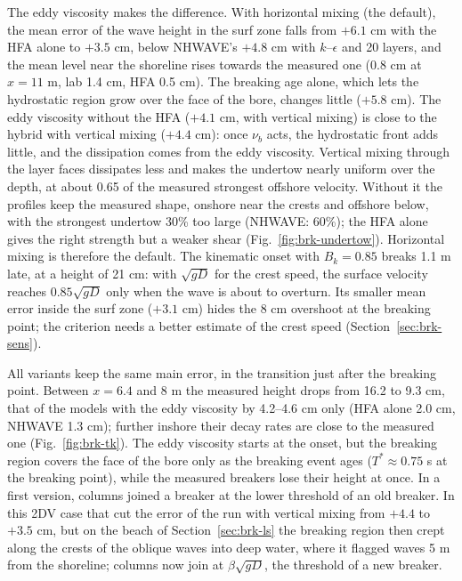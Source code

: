 The eddy viscosity makes the difference. With horizontal mixing (the
default), the mean error of the wave height in the surf zone falls from
$+6.1$ cm with the HFA alone to $+3.5$ cm, below NHWAVE's $+4.8$ cm with
$k$--$\epsilon$ and 20 layers, and the mean level near the shoreline rises
towards the measured one (0.8 cm at $x = 11$ m, lab 1.4 cm, HFA 0.5 cm).
The breaking age alone, which lets the hydrostatic region grow over the
face of the bore, changes little ($+5.8$ cm). The eddy viscosity without the HFA ($+4.1$ cm, with vertical mixing)
is close to the hybrid with vertical mixing ($+4.4$ cm): once $\nu_b$ acts,
the hydrostatic front adds little, and the dissipation comes from the eddy
viscosity. Vertical mixing through the layer faces dissipates less and
makes the undertow nearly uniform over the depth, at about 0.65 of the
measured strongest offshore velocity. Without it the profiles keep the
measured shape, onshore near the crests and offshore below, with the
strongest undertow 30\% too large (NHWAVE: 60\%); the HFA alone gives the
right strength but a weaker shear (Fig.~\ref{fig:brk-undertow}). Horizontal
mixing is therefore the default. The kinematic onset with $B_k = 0.85$
breaks 1.1 m late, at a height of 21 cm: with $\sqrt{gD}$ for the crest
speed, the surface velocity reaches $0.85\sqrt{gD}$ only when the wave is
about to overturn. Its smaller mean error inside the surf zone ($+3.1$ cm)
hides the 8 cm overshoot at the breaking point; the criterion needs a better
estimate of the crest speed (Section~\ref{sec:brk-sens}).

All variants keep the same main error, in the transition just after the
breaking point. Between $x = 6.4$ and 8 m the measured height drops from 16.2
to 9.3 cm, that of the models with the eddy viscosity by 4.2--4.6 cm only
(HFA alone 2.0 cm, NHWAVE 1.3 cm); further inshore their decay rates are
close to the measured one (Fig.~\ref{fig:brk-tk}). The eddy
viscosity starts at the onset, but the breaking region covers the face of
the bore only as the breaking event ages ($T^* \approx 0.75$ s at the
breaking point), while the measured breakers lose their height at once. In
a first version, columns joined a breaker at the lower threshold of an old
breaker. In this 2DV case that cut the error of the run with vertical mixing
from $+4.4$ to $+3.5$ cm, but on the beach of Section~\ref{sec:brk-ls} the
breaking region then crept along the crests of the oblique waves into deep
water, where it flagged waves 5 m from the shoreline; columns now join at
$\beta\sqrt{gD}$, the threshold of a new breaker.

